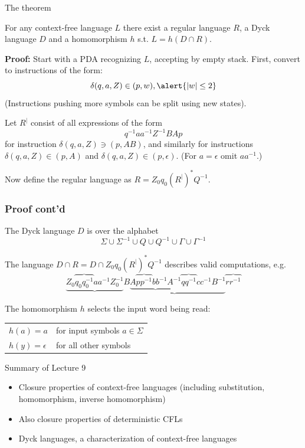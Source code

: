 \documentclass[handout]{beamer}
\begin{document}
\begin{frame}{The theorem}

    \begin{theorem}
        For any context-free language $L$ there exist a regular language $R$, a Dyck language $D$ and a homomorphism $h$ s.t. $L=h(D\cap R)$.
    \end{theorem}
    
    \textbf{Proof:} Start with a PDA recognizing $L$, accepting by empty stack.
    First, convert to instructions of the form:
    $$
    \delta(q,a,Z)\in (p,w), \alert{|w|\leq 2}
    $$ 
    (Instructions pushing more symbols can be split using new states).
            
    Let $R^|$ consist of all expressions of the form 
    $$
    q^{-1}aa^{-1}Z^{-1}BAp
    $$ 
    for instruction $\delta(q,a,Z)\ni (p,AB)$, and similarly for instructions $\delta(q,a,Z)\in (p,A)$ and $\delta(q,a,Z)\in (p,\epsilon)$. (For $a=\epsilon$ omit $aa^{-1}$.)
    
Now define the regular language as $R=Z_0q_0(R^|)^*Q^{-1}$.
    
    
    

\end{frame}


\begin{frame}
    \frametitle{Proof cont'd}

    The Dyck language $D$ is over the alphabet
    $$
    \Sigma\cup \Sigma^{-1} \cup Q\cup Q^{-1}\cup \Gamma\cup \Gamma^{-1}
    $$

    The language $D\cap R=D\cap Z_0q_0(R^|)^*Q^{-1}$ describes valid computations, e.g.
    $$
    \underbrace{Z_0\overbrace{q_0q_0^{-1}}aa^{-1}Z_0^{-1}}\underbrace{B\underbrace{A\overbrace{pp^{-1}}bb^{-1}A^{-1}}\overbrace{qq^{-1}}cc^{-1}B^{-1}}\overbrace{rr^{-1}}
    $$

    The homomorphism $h$ selects the input word being read:
      
    \begin{center}
        \begin{tabular}{l l}
            $h(a)=a$ & for input symbols $a\in\Sigma$\\
            $h(y)=\epsilon$ & for all other symbols
        \end{tabular}
    \end{center}    
    \hfill\qedsymbol

\end{frame}


\begin{frame}{Summary of Lecture 9}

    \begin{itemize}        
        \item Closure properties of context-free languages (including substitution, homomorphism, inverse homomorphism)
        \item Also closure properties of deterministic CFLs
        \item Dyck languages, a characterization of context-free languages
    \end{itemize}

\end{frame}
\end{document}
